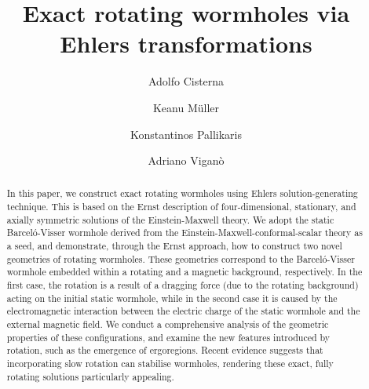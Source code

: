 \documentclass[aps,preprint,groupedaddress,nofootinbib,superscriptaddress,showkeys,showpacs,eqsecnum,amsmath,amssymb]{revtex4-1}
\begin{document}
\title{Exact rotating wormholes via Ehlers transformations} 

\author{Adolfo Cisterna}

\author{Keanu Müller}

\author{Konstantinos Pallikaris}

\author{Adriano Viganò}

\begin{abstract}

In this paper, we construct exact rotating wormholes using Ehlers solution-generating technique. This is based on the Ernst description of four-dimensional, stationary, and axially symmetric solutions of the Einstein-Maxwell theory. We adopt the static Barcel\'o-Visser wormhole derived from the Einstein-Maxwell-conformal-scalar theory as a seed, and demonstrate, through the Ernst approach, how to construct two novel geometries of rotating wormholes. These geometries correspond to the Barcel\'o-Visser wormhole embedded within a rotating and a magnetic background, respectively. In the first case, the rotation is a result of a dragging force (due to the rotating background) acting on the initial static wormhole, while in the second case it is caused by the electromagnetic interaction between the electric charge of the static wormhole and the external magnetic field. We conduct a comprehensive analysis of the geometric properties of these configurations, and examine the new features introduced by rotation, such as the emergence of ergoregions. Recent evidence suggests that incorporating slow rotation can stabilise wormholes, rendering these exact, fully rotating solutions particularly appealing. %
\end{abstract}

\end{document}
